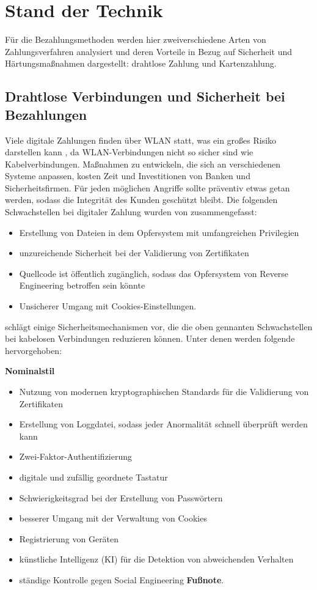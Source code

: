 \section{Stand der Technik}

Für die Bezahlungsmethoden werden hier zweiverschiedene Arten von Zahlungsverfahren analysiert und deren
Vorteile in Bezug auf Sicherheit und Härtungsmaßnahmen dargestellt: drahtlose Zahlung und Kartenzahlung.

\subsection{Drahtlose Verbindungen und Sicherheit bei Bezahlungen}

Viele digitale Zahlungen finden über WLAN statt, was ein großes Risiko darstellen kann \cite{refip:NYRS}, 
da WLAN-Verbindungen nicht so sicher sind wie Kabelverbindungen. Maßnahmen zu entwickeln, die sich an 
verschiedenen Systeme anpassen, kosten Zeit und Investitionen von Banken und Sicherheitsfirmen. 
Für jeden möglichen Angriffe sollte präventiv etwas getan werden, sodass die Integrität des Kunden 
geschützt bleibt. Die folgenden Schwachstellen bei digitaler Zahlung wurden von \cite{refip:NYRS}
zusammengefasst:

\begin{itemize}
    \item Erstellung von Dateien in dem Opfersystem mit umfangreichen Privilegien
    \item unzureichende Sicherheit bei der Validierung von Zertifikaten
    \item Quellcode ist öffentlich zugänglich, sodass das Opfersystem von Reverse
    Engineering betroffen sein könnte
    \item Unsicherer Umgang mit Cookies-Einstellungen.
\end{itemize}

\cite{refip:NYRS} schlägt einige Sicherheitsmechanismen vor, die die oben gennanten Schwachstellen bei 
kabelosen Verbindungen reduzieren können. Unter denen werden folgende hervorgehoben: 


\textbf{Nominalstil}

\begin{itemize}
    \item Nutzung von modernen kryptographischen Standards für die Validierung von Zertifikaten
    \item Erstellung von Loggdatei, sodass jeder Anormalität schnell überprüft werden kann
    \item Zwei-Faktor-Authentifizierung
    \item digitale und zufällig geordnete Tastatur
    \item Schwierigkeitsgrad bei der Erstellung von Passwörtern
    \item besserer Umgang mit der Verwaltung von Cookies
    \item Registrierung von Geräten
    \item künstliche Intelligenz (KI) für die Detektion von abweichenden Verhalten
    \item ständige Kontrolle gegen Social Engineering \textbf{Fußnote}.
\end{itemize}


